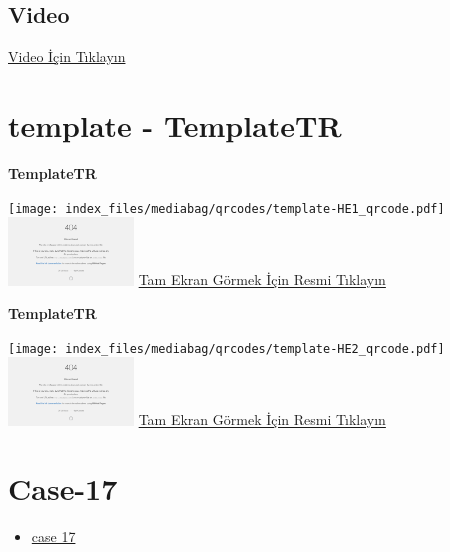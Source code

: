 \documentclass[
  letterpaper,
  DIV=11,
  numbers=noendperiod]{scrreprt}
\providecommand{\tightlist}{%
  \setlength{\itemsep}{0pt}\setlength{\parskip}{0pt}}\usepackage{longtable,booktabs,array}
\begin{document}
\hypertarget{video-15}{%
\subsection{Video}\label{video-15}}

\href{https://www.youtube.com/watch?v=Tkempcd59I0}{Video İçin Tıklayın}

\hypertarget{sec-template}{%
\section{template - TemplateTR}\label{sec-template}}

\textbf{TemplateTR}

\texttt{[image: index\_files/mediabag/qrcodes/template-HE1\_qrcode.pdf]}
\href{https://images.patolojiatlasi.com/template/HE1.html}{\includegraphics[width=0.25\textwidth,height=\textheight]{./screenshots/thumbnail_template-HE1.png}}
\href{https://images.patolojiatlasi.com/template/HE1.html}{Tam Ekran
Görmek İçin Resmi Tıklayın}

\textbf{TemplateTR}

\texttt{[image: index\_files/mediabag/qrcodes/template-HE2\_qrcode.pdf]}
\href{https://images.patolojiatlasi.com/template/HE2.html}{\includegraphics[width=0.25\textwidth,height=\textheight]{./screenshots/thumbnail_template-HE2.png}}
\href{https://images.patolojiatlasi.com/template/HE2.html}{Tam Ekran
Görmek İçin Resmi Tıklayın}

\hypertarget{sec-hacettepe-case-of-the-month-case-17}{%
\section{Case-17}\label{sec-hacettepe-case-of-the-month-case-17}}

\begin{itemize}
\tightlist
\item
  \href{https://www.youtube.com/watch?v=zlewGuN0BBY&ab_channel=KemalKosemehmetoglu}{case
  17}
\end{itemize}
\end{document}
